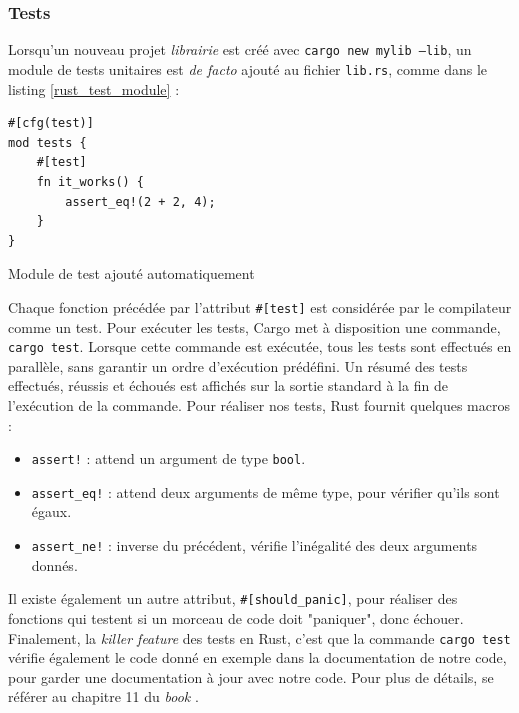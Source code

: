 \documentclass[a4paper, 12pt]{article}
\newenvironment{code}{\captionsetup{type=listing}}{}
\begin{document}
\subsubsection{Tests}
Lorsqu'un nouveau projet \textit{librairie} est créé avec \texttt{cargo new mylib --lib}, 
un module de tests unitaires est \textit{de facto} ajouté au fichier \texttt{lib.rs}, 
comme dans le listing \ref{rust_test_module} :
\bigbreak
\begin{code}
    \begin{verbatim}
#[cfg(test)]
mod tests {
    #[test]
    fn it_works() {
        assert_eq!(2 + 2, 4);
    }
}
    \end{verbatim}
    \caption{Module de test ajouté automatiquement}
    \label{rust_test_module}
\end{code}
\bigbreak
Chaque fonction précédée par l'attribut \texttt{#[test]} est considérée par le compilateur 
comme un test. Pour exécuter les tests, Cargo met à disposition une commande, \texttt{cargo test}. 
Lorsque cette commande est exécutée, tous les tests sont effectués en parallèle, sans garantir un 
ordre d'exécution prédéfini. Un résumé des tests effectués, réussis et échoués est affichés sur la 
sortie standard à la fin de l'exécution de la commande. Pour réaliser nos tests, Rust fournit 
quelques macros :
\begin{itemize}
    \item \texttt{assert!} : attend un argument de type \texttt{bool}.
    \item \texttt{assert_eq!} : attend deux arguments de même type, pour vérifier qu'ils sont égaux.
    \item \texttt{assert_ne!} : inverse du précédent, vérifie l'inégalité des deux arguments donnés.
\end{itemize}
Il existe également un autre attribut, \texttt{#[should_panic]}, pour réaliser des 
fonctions qui testent si un morceau de code doit "paniquer", donc échouer. Finalement, la 
\textit{killer feature} des tests en Rust, c'est que la commande \texttt{cargo test} 
vérifie également le code donné en exemple dans la documentation de notre code, pour garder une 
documentation à jour avec notre code.
Pour plus de détails, se référer au chapitre 11 du \textit{book} \cite{ref0}.
\end{document}
